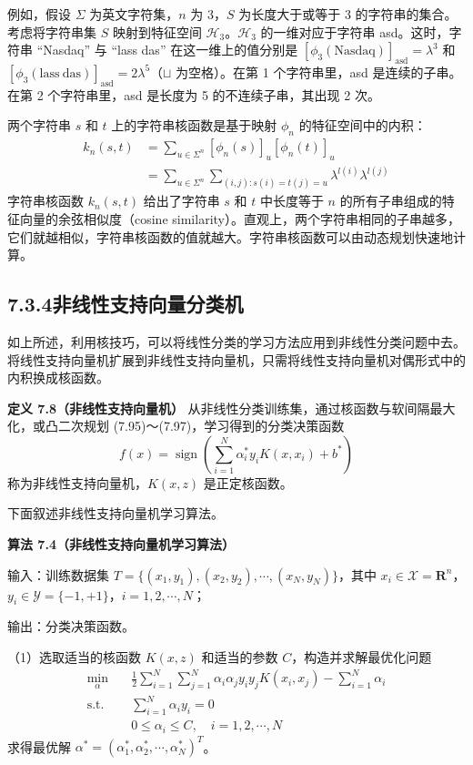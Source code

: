 \documentclass[UTF8,12pt,a4paper,fontset=fandol]{ctexart}
\begin{document}
例如，假设 $\Sigma$ 为英文字符集，$n$ 为 3，$S$ 为长度大于或等于 3 的字符串的集合。考虑将字符串集 $S$ 映射到特征空间 $\mathcal{H}_3$。$\mathcal{H}_3$ 的一维对应于字符串 asd。这时，字符串 “Nasdaq” 与 “lass das” 在这一维上的值分别是 $[\phi_3(\mathrm{Nasdaq})]_{\mathrm{asd}}=\lambda^3$ 和 $[\phi_3(\mathrm{lass\ das})]_{\mathrm{asd}}=2\lambda^5$（$\sqcup$ 为空格）。在第 1 个字符串里，asd 是连续的子串。在第 2 个字符串里，asd 是长度为 5 的不连续子串，其出现 2 次。

两个字符串 $s$ 和 $t$ 上的字符串核函数是基于映射 $\phi_n$ 的特征空间中的内积：
\begin{equation}
\begin{aligned}
k_n(s,t)
&=\sum_{u\in\Sigma^n}[\phi_n(s)]_u[\phi_n(t)]_u\\
&=\sum_{u\in\Sigma^n}\sum_{(i,j):s(i)=t(j)=u}\lambda^{l(i)}\lambda^{l(j)}
\end{aligned}
\tag{7.93}
\end{equation}
字符串核函数 $k_n(s,t)$ 给出了字符串 $s$ 和 $t$ 中长度等于 $n$ 的所有子串组成的特征向量的余弦相似度（cosine similarity）。直观上，两个字符串相同的子串越多，它们就越相似，字符串核函数的值就越大。字符串核函数可以由动态规划快速地计算。

\subsection*{7.3.4\quad 非线性支持向量分类机}

如上所述，利用核技巧，可以将线性分类的学习方法应用到非线性分类问题中去。将线性支持向量机扩展到非线性支持向量机，只需将线性支持向量机对偶形式中的内积换成核函数。

\noindent\textbf{定义 7.8（非线性支持向量机）}\quad
从非线性分类训练集，通过核函数与软间隔最大化，或凸二次规划 (7.95)～(7.97)，学习得到的分类决策函数
\begin{equation}
f(x)=\operatorname{sign}\left(\sum_{i=1}^N\alpha_i^*y_iK(x,x_i)+b^*\right)
\tag{7.94}
\end{equation}
称为非线性支持向量机，$K(x,z)$ 是正定核函数。

下面叙述非线性支持向量机学习算法。

\noindent\textbf{算法 7.4（非线性支持向量机学习算法）}

输入：训练数据集 $T=\{(x_1,y_1),(x_2,y_2),\cdots,(x_N,y_N)\}$，其中 $x_i\in\mathcal{X}=\mathbf{R}^n$，$y_i\in\mathcal{Y}=\{-1,+1\}$，$i=1,2,\cdots,N$；

输出：分类决策函数。

（1）选取适当的核函数 $K(x,z)$ 和适当的参数 $C$，构造并求解最优化问题
\begin{equation}
\begin{aligned}
\min_\alpha\quad & \frac{1}{2}\sum_{i=1}^N\sum_{j=1}^N\alpha_i\alpha_j y_i y_jK(x_i,x_j)-\sum_{i=1}^N\alpha_i\\
\mathrm{s.t.}\quad & \sum_{i=1}^N\alpha_i y_i=0\\
& 0\leq \alpha_i\leq C,\quad i=1,2,\cdots,N
\end{aligned}
\tag{7.95--7.97}
\end{equation}
求得最优解 $\alpha^*=(\alpha_1^*,\alpha_2^*,\cdots,\alpha_N^*)^T$。
\end{document}
